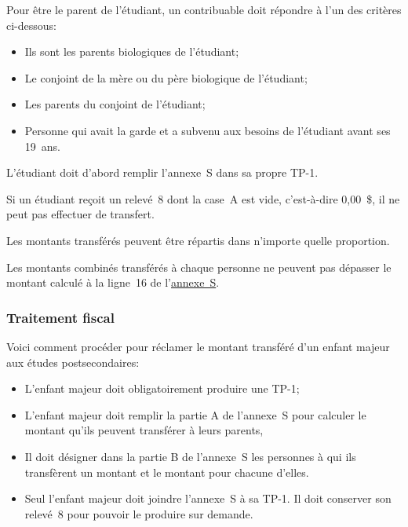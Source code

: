 Pour être le parent de l'étudiant, un contribuable doit répondre à l'un des critères ci-dessous:
\begin{itemize}
	\item Ils sont les parents biologiques de l'étudiant;
	\item Le conjoint de la mère ou du père biologique de l'étudiant;
	\item Les parents du conjoint de l'étudiant;
	\item Personne qui avait la garde et a subvenu aux besoins de l'étudiant avant ses 19~ans.
\end{itemize}

L'étudiant doit d'abord remplir l'annexe~S dans sa propre TP-1.

\begin{note}
	Si un étudiant reçoit un relevé~8 dont la case~A est vide, c'est-à-dire 0,00~\$, il ne peut pas effectuer de transfert.
\end{note}

\begin{note}
	Les montants transférés peuvent être répartis dans n'importe quelle proportion.
	
	Les montants combinés transférés à chaque personne ne peuvent pas dépasser le montant calculé à la ligne~16 de l'\href{https://www.revenuquebec.ca/documents/fr/formulaires/tp/2023-12/TP-1.D.S%282023-12%29.pdf}{annexe~S}.
\end{note}

\subsubsection{Traitement fiscal}
Voici comment procéder pour réclamer le montant transféré d'un enfant majeur aux études postsecondaires:
\begin{itemize}
	\item L'enfant majeur doit obligatoirement produire une TP-1;
	\item L'enfant majeur doit remplir la partie A de l'annexe~S pour calculer le montant qu'ils peuvent transférer à leurs parents,
	\item Il doit désigner dans la partie B de l'annexe~S les personnes à qui ils transfèrent un montant et le montant pour chacune d'elles.
	\item Seul l'enfant majeur doit joindre l'annexe~S à sa TP-1. Il doit conserver son relevé~8 pour pouvoir le produire sur demande.
\end{itemize}

